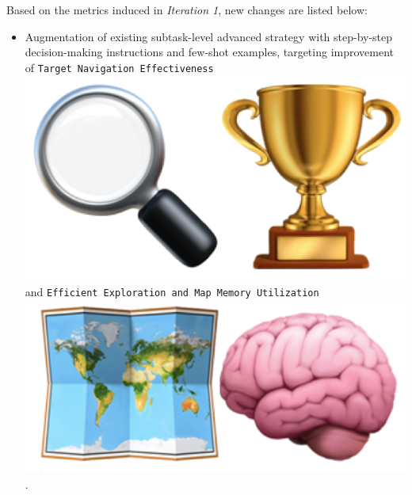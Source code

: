 \begin{flushleft}
Based on the metrics induced in \emph{Iteration 1}, new changes are listed below:
\begin{itemize}
    \item Augmentation of existing subtask-level advanced strategy with step-by-step decision-making instructions and few-shot examples, targeting improvement of  \texttt{Target Navigation Effectiveness} \includegraphics[scale=0.07]{figs/emojis/mini_1.png} and  \texttt{Efficient Exploration and Map Memory Utilization} \includegraphics[scale=0.07]{figs/emojis/mini_2.png}.

\end{itemize}
\end{flushleft}
